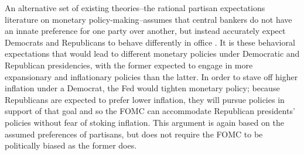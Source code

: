 \documentclass[a4paper]{article}
\begin{document}
An alternative set of existing theories--the rational partisan expectations literature on monetary policy-making--assumes that central bankers do not have an innate preference for one party over another, but instead accurately expect Democrats and Republicans to behave differently in office \citep{Alesina1991,Hibbs1994}. It is these behavioral expectations that would lead to different monetary policies under Democratic and Republican presidencies, with the former expected to engage in more expansionary and inflationary policies than the latter. In order to stave off higher inflation under a Democrat, the Fed would tighten monetary policy; because Republicans are expected to prefer lower inflation, they will pursue policies in support of that goal and so the FOMC can accommodate Republican presidents' policies without fear of stoking inflation. This argument is again based on the assumed preferences of partisans, but does not require the FOMC to be politically biased as the former does.
\end{document}
